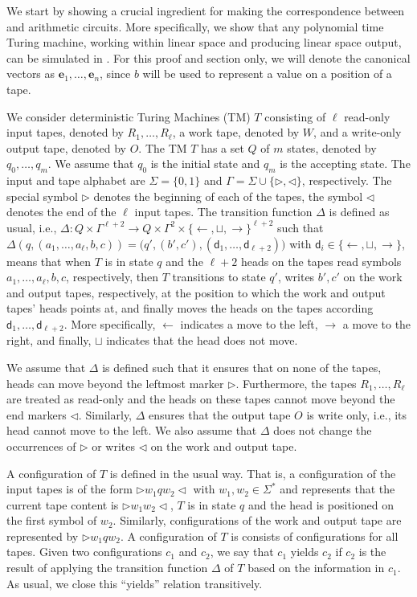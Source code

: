 We start by showing a crucial ingredient for making the correspondence between \langfor
and arithmetic circuits. More specifically, 
we show that any polynomial time Turing machine, working within linear space and producing linear space output, can be simulated in \langfor. 
For this proof and section only, we will denote the canonical vectors as
$\mathbf{e}_1, \ldots, \mathbf{e}_n$, since $b$ will be used to represent a value on a position of a tape.

We consider  deterministic Turing Machines (TM) $T$ consisting of $\ell$ read-only input tapes, 
denoted by $R_1,\ldots,R_\ell$,
a work tape, denoted by $W$, and a write-only output tape, denoted by $O$. The TM $T$ has a set $Q$ of $m$
states, denoted by $q_0,\ldots,q_m$. We assume that $q_0$ is the initial state and $q_m$ is the accepting state.
The input and tape alphabet are $\Sigma=\{0,1\}$ and $\Gamma=\Sigma\cup\{\rhd,\lhd\}$, respectively. The special 
symbol $\rhd$ denotes the beginning of each of the tapes, the symbol $\lhd$ denotes the end of the $\ell$ input tapes. 
The transition function $\Delta$ is defined as usual, i.e., 
$\Delta:Q\times \Gamma^{\ell+2} \to Q\times \Gamma^{2}\times \{\leftarrow,\sqcup,\rightarrow\}^{\ell+2}$ 
such that $\Delta(q,(a_1,\ldots,a_{\ell},b,c))=\bigl(q',(b',c'),(\mathsf{d}_1,\ldots,\mathsf{d}_{\ell+2})\bigr)$
with $\mathsf{d}_i\in \{\leftarrow,\sqcup,\rightarrow\}$, means that when $T$ is in state $q$ and the $\ell+2$ 
heads on the tapes read symbols $a_1,\ldots,a_{\ell},b,c$, respectively, then $T$ transitions to state $q'$,
writes $b',c'$ on the work and output tapes, respectively, at the position to which the work and output 
tapes' heads points at, and finally moves the heads on the tapes according 
$\mathsf{d}_1,\ldots,\mathsf{d}_{\ell+2}$. More specifically, $\leftarrow$  indicates a move to the left, 
$\rightarrow$ a move to the right, and finally, $\sqcup$ indicates that the head does not move.

We assume that $\Delta$ is defined such that it ensures that on none of the tapes, heads can move beyond 
the leftmost marker $\rhd$. Furthermore, the tapes $R_1,\ldots,R_\ell$ are treated as read-only and the heads 
on these tapes cannot move beyond the end markers $\lhd$. Similarly, $\Delta$ ensures that the output tape $O$ 
is write only, i.e., its head cannot move to the left.  We also assume that $\Delta$ does not change the 
occurrences of $\rhd$ or writes $\lhd$ on the work and output tape.

A configuration of $T$ is defined in the usual way. That is, a configuration of the input tapes is of the form
$\rhd w_1qw_2\lhd$ with $w_1,w_2\in\Sigma^*$ and represents that the current tape content is 
$\rhd w_1w_2\lhd$, $T$ is in state $q$ and the head is positioned on the first symbol of $w_2$. 
Similarly, configurations of the work and output tape are represented by $\rhd w_1qw_2$. 
A configuration of $T$ is consists of configurations for all tapes. Given two configurations 
$c_1$ and $c_2$, we say that $c_1$ yields $c_2$ if $c_2$ is the result of applying the transition 
function $\Delta$ of $T$ based on the information in $c_1$. As usual, we close this ``yields'' relation 
transitively.

